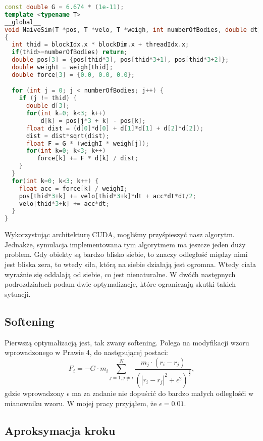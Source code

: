 \documentclass[14pt,twoside,a4paper]{article}
\begin{document}
\begin{lstlisting}[language=C++, frame=single, framerule=2pt, caption=Kernel NaiveSim]
const double G = 6.674 * (1e-11);
template <typename T>
__global__ 
void NaiveSim(T *pos, T *velo, T *weigh, int numberOfBodies, double dt) 
{
  int thid = blockIdx.x * blockDim.x + threadIdx.x;
  if(thid>=numberOfBodies) return;
  double pos[3] = {pos[thid*3], pos[thid*3+1], pos[thid*3+2]};
  double weighI = weigh[thid];
  double force[3] = {0.0, 0.0, 0.0};

  for (int j = 0; j < numberOfBodies; j++) {
    if (j != thid) {
      double d[3];
      for(int k=0; k<3; k++) 
      	  d[k] = pos[j*3 + k] - pos[k];
      float dist = (d[0]*d[0] + d[1]*d[1] + d[2]*d[2]);
      dist = dist*sqrt(dist);
      float F = G * (weighI * weigh[j]);
      for(int k=0; k<3; k++) 
		 force[k] += F * d[k] / dist;	
    }
  }
  for(int k=0; k<3; k++) {
    float acc = force[k] / weighI;
    pos[thid*3+k] += velo[thid*3+k]*dt + acc*dt*dt/2;
    velo[thid*3+k] += acc*dt;
  }
}
\end{lstlisting}
\bigskip
Wykorzystując architekturę CUDA, mogliśmy przyśpieszyć nasz algorytm. Jednakże, symulacja implementowana tym algorytmem ma jeszcze jeden duży problem. Gdy obiekty są bardzo blisko siebie, to znaczy odległość między nimi jest bliska zera, to wtedy siła, którą na siebie działają jest ogromna. Wtedy ciała wyraźnie się oddalają od siebie, co jest nienaturalne.
W dwóćh następnych podrozdziałach podam dwie optymalizacje, które ograniczają skutki takich sytuacji.

\bigskip
\subsection{\Large Softening} 

Pierwszą optymalizacją jest, tak zwany softening. Polega na modyfikacji wzoru wprowadzonego w Prawie 4, do następującej postaci:
$$F_i = -G\cdot m_i \sum_{j=1, j\neq i}^N \frac{m_j\cdot (r_i - r_j)}{(|r_i - r_j|^2 + \epsilon^{2})^{\frac{3}{2}}},$$ 
gdzie wprowadzony $\epsilon$ ma za zadanie nie dopuścić do bardzo małych odległośći w mianowniku wzoru. W mojej pracy przyjąłem, że $\epsilon = 0.01$.

\bigskip
\subsection{\Large Aproksymacja kroku}
\end{document}

